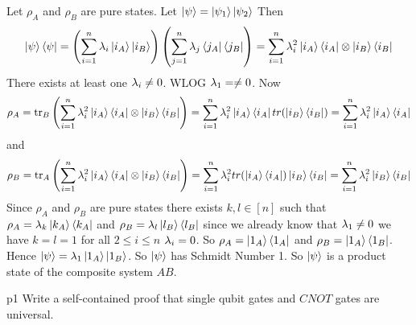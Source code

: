 \documentclass[a4paper, 11pt]{article}
\begin{document}
{\begin{itemize}
		Let $\rho_A$ and $\rho_B$ are pure states. Let $\ket{\psi}=\ket{\psi_1}\ket{\psi_2}$ Then $$\ket{\psi}\bra{\psi}=\left(\sum_{i=1}^n \lambda_i\ket{i_A}\ket{i_B}\right)\left( \sum_{j=1}^n\lambda_j\bra{j_A}\bra{j_B}\right)=\sum_{i=1}^n\lambda_i^2\ket{i_A}\bra{i_A}\otimes \ket{i_B}\bra{i_B}$$There exists at least one $\lambda_i\neq 0$. WLOG $\lambda_1=\neq 0$. Now $$\rho_A=\tr_B\left(\sum_{i=1}^n\lambda_i^2\ket{i_A}\bra{i_A}\otimes \ket{i_B}\bra{i_B}  \right)=\sum_{i=1}^n\lambda_i^2\ket{i_A}\bra{i_A}tr(\ket{i_B}\bra{i_B})=\sum_{i=1}^n\lambda_i^2\ket{i_A}\bra{i_A}$$and $$\rho_B=\tr_A\left(\sum_{i=1}^n\lambda_i^2\ket{i_A}\bra{i_A}\otimes \ket{i_B}\bra{i_B}  \right)=\sum_{i=1}^n\lambda_i^2tr(\ket{i_A}\bra{i_A})\ket{i_B}\bra{i_B}=\sum_{i=1}^n\lambda_i^2\ket{i_B}\bra{i_B}$$Since $\rho_A$ and $\rho_B$ are pure states there exists $k,l\in [n]$ such that $\rho_A=\lambda_k\ket{k_A}\bra{k_A}$ and $\rho_B=\lambda_l\ket{l_B}\bra{l_B}$ since we already know that $\lambda_1\neq 0$ we have $k=l=1$ for all $2\leq i\leq n$ $\lambda_i=0$. So $\rho_A=\ket{1_A}\bra{1_A}$ and $\rho_B=\ket{1_A}\bra{1_B}$. Hence $\ket{\psi}=\lambda_1\ket{1_A}\ket{1_B}$. So $\ket{\psi}$ has Schmidt Number 1. So $\ket{\psi}$ is a product state of the composite system $AB$.
	\end{itemize}
}



\begin{problem}{%
	}{p1%
	}
	Write a self-contained proof that single qubit gates and $CNOT$ gates are universal.
\end{problem}
\end{document}
